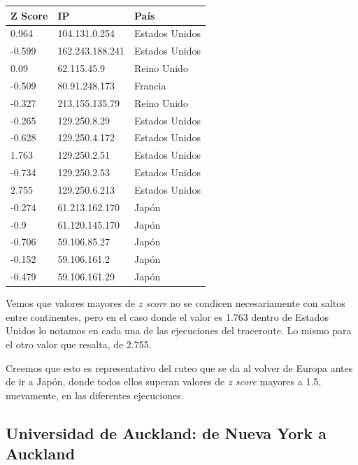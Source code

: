 \begin{table}[h]
	\begin{tabular}{l|l|l}
		Z Score & IP & País \\ \hline
		0.964 & 104.131.0.254 & Estados Unidos \\
		-0.599 & 162.243.188.241 & Estados Unidos \\
		0.09 & 62.115.45.9 & Reino Unido \\
		-0.509 & 80.91.248.173 & Francia \\
		-0.327 & 213.155.135.79 & Reino Unido \\
		-0.265 & 129.250.8.29 & Estados Unidos \\
		-0.628 & 129.250.4.172 & Estados Unidos \\
		1.763 & 129.250.2.51 & Estados Unidos \\
		-0.734 & 129.250.2.53 & Estados Unidos \\
		2.755 & 129.250.6.213 & Estados Unidos \\
		-0.274 & 61.213.162.170 & Japón \\
		-0.9 & 61.120.145.170 & Japón \\
		-0.706 & 59.106.85.27 & Japón \\
		-0.152 & 59.106.161.2 & Japón \\
		-0.479 & 59.106.161.29 & Japón
	\end{tabular}
\end{table}

Vemos que valores mayores de \textit{z score} no se condicen necesariamente con saltos entre continentes, pero en el caso donde el valor es 1.763 dentro de Estados Unidos lo notamos en cada una de las ejecuciones del traceroute. Lo mismo para el otro valor que resalta, de 2.755.

Creemos que esto es representativo del ruteo que se da al volver de Europa antes de ir a Japón, donde todos ellos superan valores de \textit{z score} mayores a 1.5, nuevamente, en las diferentes ejecuciones.

\subsection{Universidad de Auckland: de Nueva York a Auckland}


